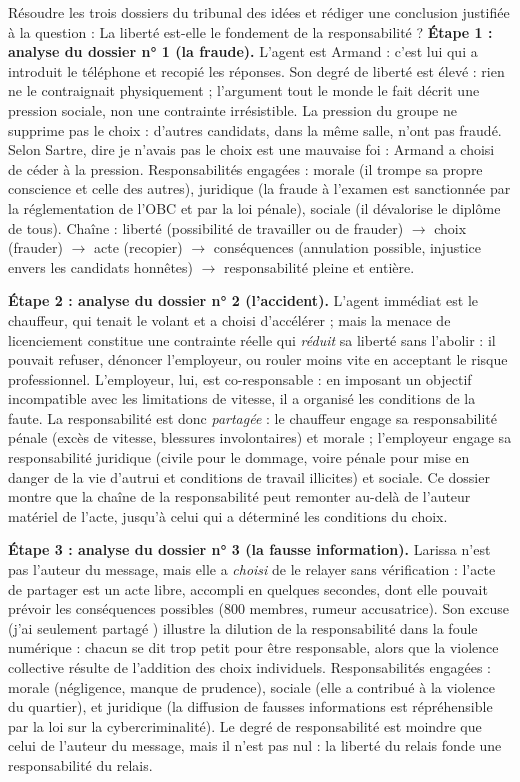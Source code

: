 \documentclass[11pt]{article}
\begin{document}
\begin{exoresolu}
Résoudre les trois dossiers du tribunal des idées et rédiger une conclusion justifiée à la question : \og La liberté est-elle le fondement de la responsabilité ? \fg{}
\tcblower
\textbf{Étape 1 : analyse du dossier n° 1 (la fraude).} L'agent est Armand : c'est lui qui a introduit le téléphone et recopié les réponses. Son degré de liberté est élevé : rien ne le contraignait physiquement ; l'argument \og tout le monde le fait \fg{} décrit une pression sociale, non une contrainte irrésistible. La pression du groupe ne supprime pas le choix : d'autres candidats, dans la même salle, n'ont pas fraudé. Selon Sartre, dire \og je n'avais pas le choix \fg{} est une mauvaise foi : Armand a choisi de céder à la pression. Responsabilités engagées : morale (il trompe sa propre conscience et celle des autres), juridique (la fraude à l'examen est sanctionnée par la réglementation de l'OBC et par la loi pénale), sociale (il dévalorise le diplôme de tous). Chaîne : liberté (possibilité de travailler ou de frauder) $\rightarrow$ choix (frauder) $\rightarrow$ acte (recopier) $\rightarrow$ conséquences (annulation possible, injustice envers les candidats honnêtes) $\rightarrow$ responsabilité pleine et entière.

\textbf{Étape 2 : analyse du dossier n° 2 (l'accident).} L'agent immédiat est le chauffeur, qui tenait le volant et a choisi d'accélérer ; mais la menace de licenciement constitue une contrainte réelle qui \emph{réduit} sa liberté sans l'abolir : il pouvait refuser, dénoncer l'employeur, ou rouler moins vite en acceptant le risque professionnel. L'employeur, lui, est co-responsable : en imposant un objectif incompatible avec les limitations de vitesse, il a organisé les conditions de la faute. La responsabilité est donc \emph{partagée} : le chauffeur engage sa responsabilité pénale (excès de vitesse, blessures involontaires) et morale ; l'employeur engage sa responsabilité juridique (civile pour le dommage, voire pénale pour mise en danger de la vie d'autrui et conditions de travail illicites) et sociale. Ce dossier montre que la chaîne de la responsabilité peut remonter au-delà de l'auteur matériel de l'acte, jusqu'à celui qui a déterminé les conditions du choix.

\textbf{Étape 3 : analyse du dossier n° 3 (la fausse information).} Larissa n'est pas l'auteur du message, mais elle a \emph{choisi} de le relayer sans vérification : l'acte de partager est un acte libre, accompli en quelques secondes, dont elle pouvait prévoir les conséquences possibles (800 membres, rumeur accusatrice). Son excuse (\og j'ai seulement partagé \fg{}) illustre la dilution de la responsabilité dans la foule numérique : chacun se dit trop petit pour être responsable, alors que la violence collective résulte de l'addition des choix individuels. Responsabilités engagées : morale (négligence, manque de prudence), sociale (elle a contribué à la violence du quartier), et juridique (la diffusion de fausses informations est répréhensible par la loi sur la cybercriminalité). Le degré de responsabilité est moindre que celui de l'auteur du message, mais il n'est pas nul : la liberté du relais fonde une responsabilité du relais.


\end{exoresolu}
\end{document}
